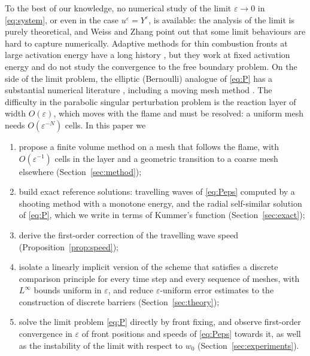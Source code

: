 \documentclass[11pt]{amsart}
\theoremstyle{remark}
\newcommand{\ve}{\varepsilon}
\begin{document}
To the best of our knowledge, no numerical study of the limit $\ve\to0$ in
\eqref{eq:system}, or even in the case $u^\ve=Y^\ve$, is available: the
analysis of the limit
\cite{CaffarelliVazquez1995,CaffarelliLedermanWolanski1997a,Weiss2003,PetrosyanYip2008,WeissZhang2009}
is purely theoretical, and Weiss and Zhang \cite{WeissZhang2009} point out that
some limit behaviours are hard to capture numerically. Adaptive methods for
thin combustion fronts at large activation energy have a long history
\cite{Smooke1982,BaylissGottliebMatkowskyMinkoff1989,DenetHaldenwang1992},
but they work at fixed activation energy and do not study the convergence to
the free boundary problem. On the side of the limit problem, the elliptic
(Bernoulli) analogue of \eqref{eq:P} \cite{AltCaffarelli1981,BerestyckiCaffarelliNirenberg1990} has a substantial numerical literature
\cite{FlucherRumpf1997,Tiihonen1997,KarkkainenTiihonen1999,BouchonClainTouzani2005,HarbrechtMitrou2014},
including a moving mesh method \cite{ShenDaiHuang2024}. The difficulty in the
parabolic singular perturbation problem is the reaction layer of width
$O(\ve)$, which moves with the flame and must be resolved: a uniform mesh needs
$O(\ve^{-N})$ cells. In this paper we
\begin{enumerate}
\item propose a finite volume method on a mesh that follows the flame,
with $O(\ve^{-1})$ cells in the layer and a geometric transition to a coarse
mesh elsewhere (Section~\ref{sec:method});
\item build exact reference solutions: travelling waves of \eqref{eq:Peps}
computed by a shooting method with a monotone energy, and the radial
self-similar solution of \eqref{eq:P}, which we write in terms of Kummer's
function (Section~\ref{sec:exact});
\item derive the first-order correction of the travelling wave speed
(Proposition~\ref{prop:speed});
\item isolate a linearly implicit version of the scheme that satisfies a
discrete comparison principle for every time step and every sequence of
meshes, with $L^\infty$ bounds uniform in $\ve$, and reduce $\ve$-uniform
error estimates to the construction of discrete barriers
(Section~\ref{sec:theory});
\item solve the limit problem \eqref{eq:P} directly by front fixing, and
observe first-order convergence in $\ve$ of front positions and speeds of
\eqref{eq:Peps} towards it, as well as the instability of the limit with
respect to $w_0$ (Section~\ref{sec:experiments}).
\end{enumerate}
\end{document}

